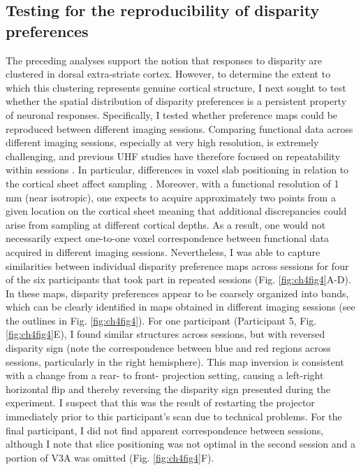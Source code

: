 \subsection{Testing for the reproducibility of disparity preferences}
The preceding analyses support the notion that responses to disparity are clustered in dorsal extra-striate cortex. However, to determine the extent to which this clustering represents genuine cortical structure, I next sought to test whether the spatial distribution of disparity preferences is a persistent property of neuronal responses. Specifically, I tested whether preference maps could be reproduced between different imaging sessions. 
Comparing functional data across different imaging sessions, especially at very high resolution, is extremely challenging, and previous UHF studies have therefore focused on repeatability within sessions \cite{Cheng:2001fk,Yacoub:2008hr}. In particular, differences in voxel slab positioning in relation to the cortical sheet affect sampling \cite{Cheng:2001fk}. Moreover, with a functional resolution of 1 mm (near isotropic), one expects to acquire approximately two points from a given location on the cortical sheet meaning that additional discrepancies could arise from sampling at different cortical depths. As a result, one would not necessarily expect one-to-one voxel correspondence between functional data acquired in different imaging sessions.
Nevertheless, I was able to capture similarities between individual disparity preference maps across sessions for four of the six participants that took part in repeated sessions (Fig. \ref{fig:ch4fig4}A-D). In these maps, disparity preferences appear to be coarsely organized into bands, which can be clearly identified in maps obtained in different imaging sessions (see the outlines in Fig. \ref{fig:ch4fig4}). For one participant (Participant 5, Fig. \ref{fig:ch4fig4}E), I found similar structures across sessions, but with reversed disparity sign (note the correspondence between blue and red regions across sessions, particularly in the right hemisphere). This map inversion is consistent with a change from a rear- to front- projection setting, causing a left-right horizontal flip and thereby reversing the disparity sign presented during the experiment. I suspect that this was the result of restarting the projector immediately prior to this participant's scan due to technical problems. For the final participant, I did not find apparent correspondence between sessions, although I note that slice positioning was not optimal in the second session and a portion of V3A was omitted (Fig. \ref{fig:ch4fig4}F).

